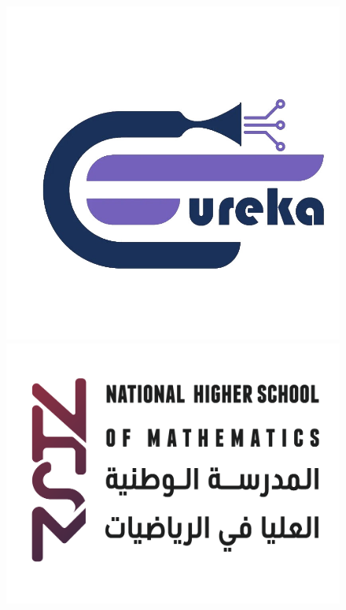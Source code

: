 \renewcommand{\hmwkAuthorName}{}
\renewcommand{\hmwkTitle}{Pointset Topology}
\newcommand{\hmwkSubTitle}{prerequisite problem set}
\newcommand{\hmwkSummary}{}
\newcommand{\dueDate}{Translated Headline}
\newcommand{\university}{National Higher School of Mathematics}

\newenvironment{myfont}{\selectfont}{\par}


\thispagestyle{empty}
\myfont
\raggedright
\begin{figure} [H]
    \centering
    \begin{minipage}[t]{.30\linewidth}
    \raggedright
    \includegraphics[width=0.8\linewidth]{eureka.logo.jpg}
    \end{minipage}
    \hfill
    \begin{minipage}[t]{.30\linewidth}
        \raggedleft
        \includegraphics[width =0.8\linewidth]{nhsm.logo.png}
    \end{minipage}
\end{figure}


